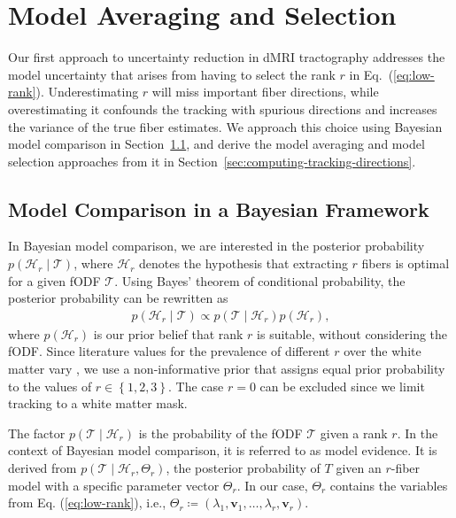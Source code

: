 \section{Model Averaging and Selection}\label{sec:Models}

Our first approach to uncertainty reduction in dMRI tractography addresses the model uncertainty that arises from having to select the rank $r$ in Eq.~(\ref{eq:low-rank}). Underestimating $r$ will miss important fiber directions, while overestimating it confounds the tracking with spurious directions and increases the variance of the true fiber estimates. We approach this choice using Bayesian model comparison in Section~\ref{sec:model-comparison}, and derive the model averaging and model selection approaches from it in Section~\ref{sec:computing-tracking-directions}.

\subsection{Model Comparison in a Bayesian Framework}
\label{sec:model-comparison}
In Bayesian model comparison, we are interested in the
posterior probability $p \left( \mathcal{H}_r \mid \mathcal{T} \right)$, where
$\mathcal{H}_r$ denotes the hypothesis that extracting $r$ fibers is optimal for a given fODF $\mathcal{T}$. Using Bayes' theorem of
conditional probability, the posterior probability can be rewritten as
\begin{align}
	p \left( \mathcal{H}_r \mid \mathcal{T} \right) \propto p \left(
		\mathcal{T} \mid \mathcal{H}_r 
	\right) p \left(  \mathcal{H}_r \right), 
	\label{eq:Bayes}
\end{align}
where $p \left(  \mathcal{H}_r \right)$ is our prior belief that rank $r$ is
suitable, without considering the fODF. Since literature values for the prevalence of different $r$ over the white matter vary  \cite{BEHRENS2007144,Jeurissen:2012, Schultz:MICCAI12}, we use a
non-informative prior that assigns equal prior probability to the values of $r
\in \left\{ 1,2,3 \right\}$. The case $r=0$ can be excluded since we limit
tracking to a white matter mask. 

The factor $p \left( \mathcal{T} \mid \mathcal{H}_r \right)$ is the
probability of the fODF $\mathcal{T}$ given a rank $r$. In the context of
Bayesian model comparison, it is referred to as model evidence. It is derived from $p
\left( \mathcal{T} \mid \mathcal{H}_r , \Theta_r \right)$, the posterior
probability of $T$ given an $r$-fiber model with a specific parameter vector
$\Theta_r$. In our case, $\Theta_r$ contains the variables from Eq.
(\ref{eq:low-rank}), i.e., $\Theta_r \coloneqq \left( \lambda_1 , \mathbf{v}_1 , \dots
, \lambda_r , \mathbf{v}_r \right)$. 

